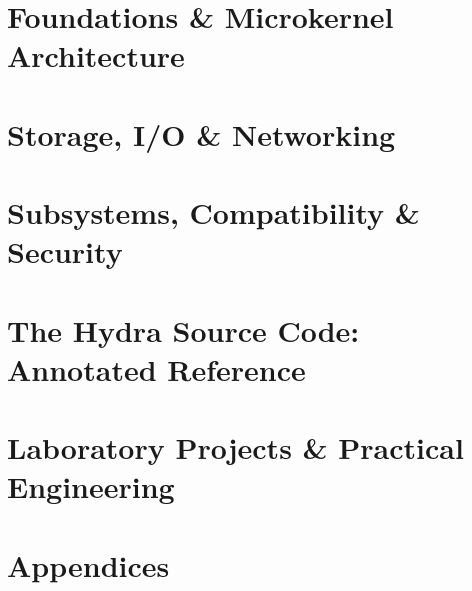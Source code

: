 \documentclass[11pt,openright,twoside]{book}
\begin{document}
\frontmatter





\tableofcontents
\listoffigures
\listoftables

\mainmatter

\part{Foundations \& Microkernel Architecture}




\part{Storage, I/O \& Networking}




\part{Subsystems, Compatibility \& Security}



\part{The Hydra Source Code: Annotated Reference}






\part{Laboratory Projects \& Practical Engineering}


\appendix
\part{Appendices}






\backmatter




\printindex
\end{document}
